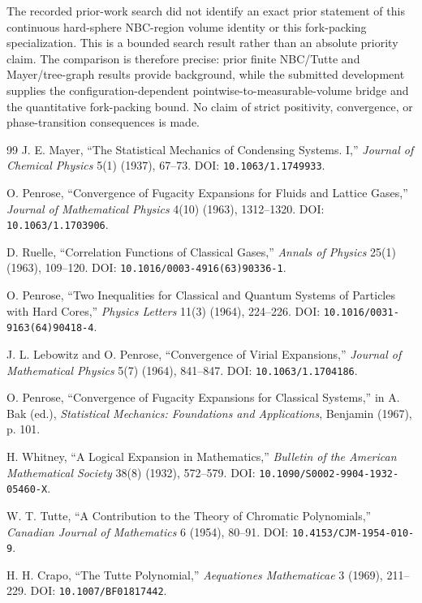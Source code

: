 \documentclass[11pt]{article}
\newcommand{\1}{\mathbf{1}}
\begin{document}
The recorded prior-work search did not identify an exact prior statement of
this continuous hard-sphere NBC-region volume identity or this fork-packing
specialization.  This is a bounded search result rather than an absolute
priority claim.  The comparison is therefore precise: prior finite NBC/Tutte
and Mayer/tree-graph results provide background, while the
submitted development supplies the configuration-dependent
pointwise-to-measurable-volume bridge and the quantitative fork-packing bound.
No claim of strict positivity, convergence, or phase-transition consequences is
made.

\begin{thebibliography}{99}
 J. E. Mayer, ``The Statistical Mechanics of Condensing
Systems. I,'' \emph{Journal of Chemical Physics} 5(1) (1937), 67--73.
DOI: \texttt{10.1063/1.1749933}.

 O. Penrose, ``Convergence of Fugacity Expansions for
Fluids and Lattice Gases,'' \emph{Journal of Mathematical Physics} 4(10)
(1963), 1312--1320. DOI: \texttt{10.1063/1.1703906}.

 D. Ruelle, ``Correlation Functions of Classical Gases,''
\emph{Annals of Physics} 25(1) (1963), 109--120.
DOI: \texttt{10.1016/0003-4916(63)90336-1}.

 O. Penrose, ``Two Inequalities for Classical and Quantum
Systems of Particles with Hard Cores,'' \emph{Physics Letters} 11(3) (1964),
224--226. DOI: \texttt{10.1016/0031-9163(64)90418-4}.

 J. L. Lebowitz and O. Penrose, ``Convergence of
Virial Expansions,'' \emph{Journal of Mathematical Physics} 5(7) (1964),
841--847. DOI: \texttt{10.1063/1.1704186}.

 O. Penrose, ``Convergence of Fugacity Expansions for
Classical Systems,'' in A. Bak (ed.), \emph{Statistical Mechanics: Foundations
and Applications}, Benjamin (1967), p. 101.

 H. Whitney, ``A Logical Expansion in Mathematics,''
\emph{Bulletin of the American Mathematical Society} 38(8) (1932), 572--579.
DOI: \texttt{10.1090/S0002-9904-1932-05460-X}.

 W. T. Tutte, ``A Contribution to the Theory of Chromatic
Polynomials,'' \emph{Canadian Journal of Mathematics} 6 (1954), 80--91.
DOI: \texttt{10.4153/CJM-1954-010-9}.

 H. H. Crapo, ``The Tutte Polynomial,''
\emph{Aequationes Mathematicae} 3 (1969), 211--229.
DOI: \texttt{10.1007/BF01817442}.


\end{thebibliography}
\end{document}
